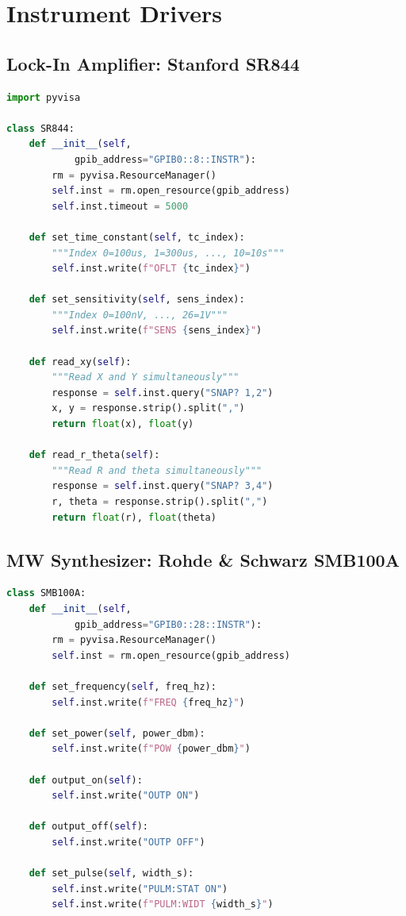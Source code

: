 \documentclass[11pt,a4paper,openany]{book}
\begin{document}
\section{Instrument Drivers}

\subsection{Lock-In Amplifier: Stanford SR844}

\begin{lstlisting}[language=Python,caption={SR844 lock-in amplifier driver}]
import pyvisa

class SR844:
    def __init__(self,
            gpib_address="GPIB0::8::INSTR"):
        rm = pyvisa.ResourceManager()
        self.inst = rm.open_resource(gpib_address)
        self.inst.timeout = 5000

    def set_time_constant(self, tc_index):
        """Index 0=100us, 1=300us, ..., 10=10s"""
        self.inst.write(f"OFLT {tc_index}")

    def set_sensitivity(self, sens_index):
        """Index 0=100nV, ..., 26=1V"""
        self.inst.write(f"SENS {sens_index}")

    def read_xy(self):
        """Read X and Y simultaneously"""
        response = self.inst.query("SNAP? 1,2")
        x, y = response.strip().split(",")
        return float(x), float(y)

    def read_r_theta(self):
        """Read R and theta simultaneously"""
        response = self.inst.query("SNAP? 3,4")
        r, theta = response.strip().split(",")
        return float(r), float(theta)
\end{lstlisting}

\subsection{MW Synthesizer: Rohde \& Schwarz SMB100A}

\begin{lstlisting}[language=Python,caption={SMB100A microwave synthesizer driver}]
class SMB100A:
    def __init__(self,
            gpib_address="GPIB0::28::INSTR"):
        rm = pyvisa.ResourceManager()
        self.inst = rm.open_resource(gpib_address)

    def set_frequency(self, freq_hz):
        self.inst.write(f"FREQ {freq_hz}")

    def set_power(self, power_dbm):
        self.inst.write(f"POW {power_dbm}")

    def output_on(self):
        self.inst.write("OUTP ON")

    def output_off(self):
        self.inst.write("OUTP OFF")

    def set_pulse(self, width_s):
        self.inst.write("PULM:STAT ON")
        self.inst.write(f"PULM:WIDT {width_s}")
\end{lstlisting}
\end{document}
